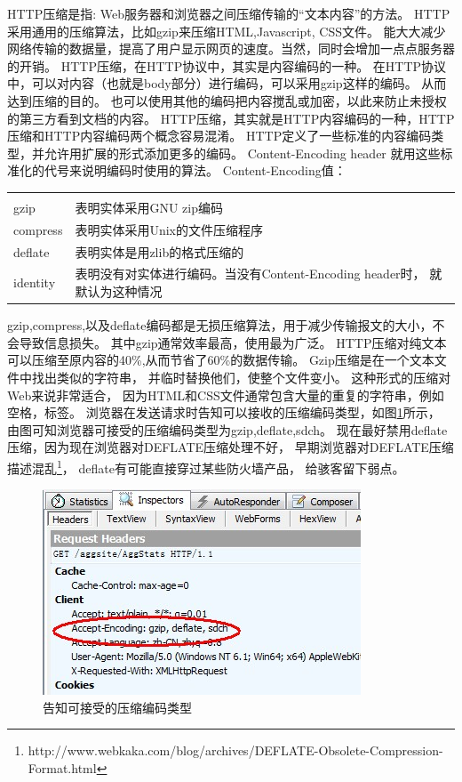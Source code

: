 \documentclass{book}
\begin{document}
HTTP压缩是指: Web服务器和浏览器之间压缩传输的“文本内容”的方法。
HTTP采用通用的压缩算法，比如gzip来压缩HTML,Javascript, CSS文件。
能大大减少网络传输的数据量，提高了用户显示网页的速度。当然，同时会增加一点点服务器的开销。
HTTP压缩，在HTTP协议中，其实是内容编码的一种。
在HTTP协议中，可以对内容（也就是body部分）进行编码，可以采用gzip这样的编码。
从而达到压缩的目的。 也可以使用其他的编码把内容搅乱或加密，以此来防止未授权的第三方看到文档的内容。
HTTP压缩，其实就是HTTP内容编码的一种，HTTP压缩和HTTP内容编码两个概念容易混淆。
HTTP定义了一些标准的内容编码类型，并允许用扩展的形式添加更多的编码。
Content-Encoding header 就用这些标准化的代号来说明编码时使用的算法。
Content-Encoding值：

\begin{tabular}{l|p{12cm}}
	\multirow{1}{*}{}			
	& \multicolumn{1}{c}{}\\
	gzip & 表明实体采用GNU zip编码\\
	compress & 表明实体采用Unix的文件压缩程序\\
	deflate & 表明实体是用zlib的格式压缩的\\
	identity & 表明没有对实体进行编码。当没有Content-Encoding header时， 就默认为这种情况\\
\end{tabular}

gzip,compress,以及deflate编码都是无损压缩算法，用于减少传输报文的大小，不会导致信息损失。
其中gzip通常效率最高，使用最为广泛。 HTTP压缩对纯文本可以压缩至原内容的40\%,从而节省了60\%的数据传输。 
Gzip压缩是在一个文本文件中找出类似的字符串， 并临时替换他们，使整个文件变小。
这种形式的压缩对Web来说非常适合， 因为HTML和CSS文件通常包含大量的重复的字符串，例如空格，标签。
浏览器在发送请求时告知可以接收的压缩编码类型，如图\ref{fig:BrowserAcceptCodingType}所示，
由图可知浏览器可接受的压缩编码类型为gzip,deflate,sdch。
现在最好禁用deflate压缩，因为现在浏览器对DEFLATE压缩处理不好，
早期浏览器对DEFLATE压缩描述混乱\footnote{http://www.webkaka.com/blog/archives/DEFLATE-Obsolete-Compression-Format.html}，
deflate有可能直接穿过某些防火墙产品，
给骇客留下弱点。

\begin{figure}[htbp]
	\centering
	\includegraphics[scale=1]{HttpAcceptCompressEncoding.jpg}
	\caption{告知可接受的压缩编码类型}
	\label{fig:BrowserAcceptCodingType}
\end{figure}
\end{document}
